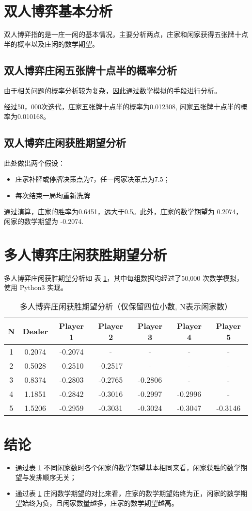 \documentclass[10pt,twocolumn,letterpaper]{article}
\begin{document}
\section{双人博弈基本分析}
双人博弈指的是一庄一闲的基本情况，主要分析两点，庄家和闲家获得五张牌十点半的概率以及庄闲的数学期望。
\subsection{双人博弈庄闲五张牌十点半的概率分析}
由于相关问题的概率分析较为复杂，因此通过数学模拟的手段进行分析。

经过50，000次迭代，庄家五张牌十点半的概率为0.012308, 闲家五张牌十点半的概率为0.010168。
\subsection{双人博弈庄闲获胜期望分析}
此处做出两个假设：

\begin{itemize}
   \item 庄家补牌或停牌决策点为7，任一闲家决策点为7.5；
   \item 每次结束一局均重新洗牌
\end{itemize}

通过演算，庄家的胜率为0.6451，远大于0.5。此外，庄家的数学期望为 0.2074，闲家的数学期望为 -0.2074. 

\section{多人博弈庄闲获胜期望分析}
多人博弈庄闲获胜期望分析如 表 \ref{lab:1}，其中每组数据均经过了50,000 次数学模拟，使用 Python3 实现。

\begin{table}
   \centering
   \caption{多人博弈庄闲获胜期望分析（仅保留四位小数, N表示闲家数）}
   \label{lab:1}
   \small
   \begin{tabular}{c|c|c|c|c|c|c}
      \hline
      N & Dealer & Player 1 & Player 2 & Player 3 & Player 4 & Player 5\\
      \hline
      1 & 0.2074 & -0.2074 & - & - & - & - \\
      2 & 0.5028 & -0.2510 & -0.2517& - & - & - \\
      3 & 0.8374 & -0.2803 & -0.2765 & -0.2806& - & - \\
      4 & 1.1851 & -0.2842 & -0.3016 & -0.2997 & -0.2996& - \\
      5 & 1.5206 & -0.2959 & -0.3031 & -0.3024 & -0.3047 & -0.3146\\
      \hline
   \end{tabular}
\end{table}

\section{结论}
\begin{itemize}
   \item 通过表 \ref{lab:1} 不同闲家数时各个闲家的数学期望基本相同来看，闲家获胜的数学期望与发排顺序无关；
   \item 通过表 \ref{lab:1} 庄闲数学期望的对比来看，庄家的数学期望始终为正，闲家的数学期望始终为负，且闲家数量越多，庄家的数学期望越高。
\end{itemize}

% 
% 
\end{document}
